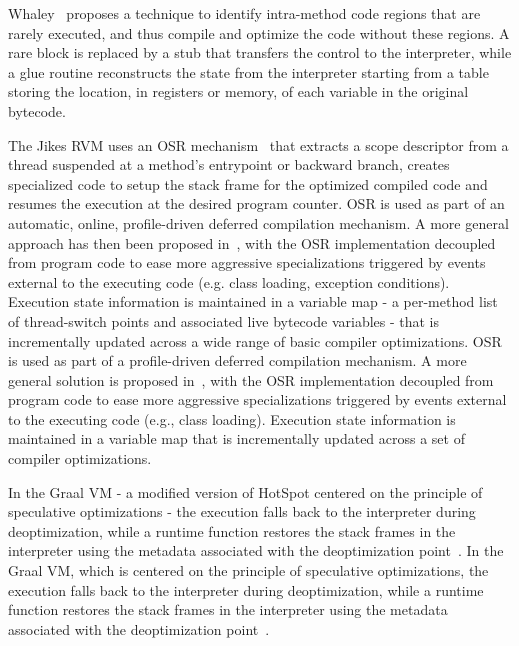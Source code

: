 \ifdefined \fullver
Whaley~\cite{whaley2001osr} proposes a technique to identify intra-method code regions that are rarely executed, and thus compile and optimize the code without these regions. A rare block is replaced by a stub that transfers the control to the interpreter, while a glue routine reconstructs the state from the interpreter starting from a table storing the location, in registers or memory, of each variable in the original bytecode.
\fi

The Jikes RVM uses an OSR mechanism~\cite{fink2003design} that extracts a scope descriptor from a thread suspended at a method's entrypoint or backward branch, creates specialized code to setup the stack frame for the optimized compiled code and resumes the execution at the desired program counter. 
\ifdefined \fullver
OSR is used as part of an automatic, online, profile-driven deferred compilation mechanism.
A more general approach has then been proposed in~\cite{soman2006efficient}, with the OSR implementation decoupled from program code to ease more aggressive specializations triggered by events external to the executing code (e.g. class loading, exception conditions). Execution state information is maintained in a variable map - a per-method list of thread-switch points and associated live bytecode variables - that is incrementally updated across a wide range of basic compiler optimizations.
\else
OSR is used as part of a profile-driven deferred compilation mechanism.
A more general solution is proposed in~\cite{soman2006efficient}, with the OSR implementation decoupled from program code to ease more aggressive specializations triggered by events external to the executing code (e.g., class loading). Execution state information is maintained in a variable map that is incrementally updated across a set of compiler optimizations.
\fi

\ifdefined \fullver
In the Graal VM - a modified version of HotSpot centered on the principle of speculative optimizations - the execution falls back to the interpreter during deoptimization, while a runtime function restores the stack frames in the interpreter using the metadata associated with the deoptimization point~\cite{duboscq2013graal,wurthinger2013truffle,duboscq2014metadata}.
\else
In the Graal VM, which is centered on the principle of speculative optimizations, the execution falls back to the interpreter during deoptimization, while a runtime function restores the stack frames in the interpreter using the metadata associated with the deoptimization point~\cite{duboscq2013graal,wurthinger2013truffle,duboscq2014metadata}.
\fi

